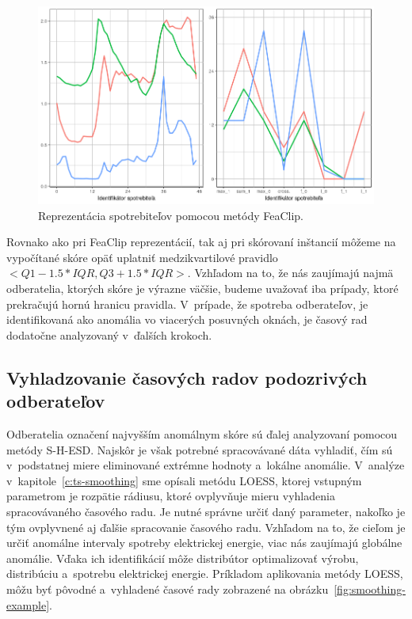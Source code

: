 \documentclass[a4paper,twoside,slovak,12pt,appendix]{article}
\begin{document}
\begin{figure}[htbp]
  \centering
  \includegraphics[width=\textwidth]{feaclip_example.png}
  \caption{Reprezentácia spotrebiteľov pomocou metódy FeaClip.}
  \label{fig:feaclip-example}
\end{figure}

\noindent
Rovnako ako pri FeaClip reprezentácií, tak aj pri skórovaní inštancií môžeme na
vypočítané skóre opäť uplatniť medzikvartilové pravidlo $<Q1 - 1.5 *
IQR, Q3 + 1.5 * IQR>$. Vzhľadom na to, že nás zaujímajú najmä odberatelia,
ktorých skóre je výrazne väčšie, budeme uvažovať iba prípady, ktoré prekračujú
hornú hranicu pravidla. V~prípade, že spotreba odberateľov, je identifikovaná
ako anomália vo viacerých posuvných oknách, je časový rad dodatočne analyzovaný
v~ďalších krokoch.

\subsection{Vyhladzovanie časových radov podozrivých odberateľov}
Odberatelia označení najvyšším anomálnym skóre sú ďalej analyzovaní pomocou
metódy S-H-ESD. Najskôr je však potrebné spracovávané dáta vyhladiť, čím sú
v~podstatnej miere eliminované extrémne hodnoty a~lokálne anomálie. V~analýze
v~kapitole~\ref{c:ts-smoothing} sme opísali metódu LOESS, ktorej vstupným
parametrom je rozpätie rádiusu, ktoré ovplyvňuje mieru vyhladenia
spracovávaného časového radu. Je nutné správne určiť daný parameter, nakoľko
je tým ovplyvnené aj ďalšie spracovanie časového radu. Vzhľadom na to, že cieľom
je určiť anomálne intervaly spotreby elektrickej energie, viac nás zaujímajú
globálne anomálie. Vďaka ich identifikácií môže distribútor optimalizovať
výrobu, distribúciu a~spotrebu elektrickej energie. Príkladom aplikovania metódy
LOESS, môžu byť pôvodné a~vyhladené časové rady zobrazené na
obrázku~\ref{fig:smoothing-example}.
\end{document}
